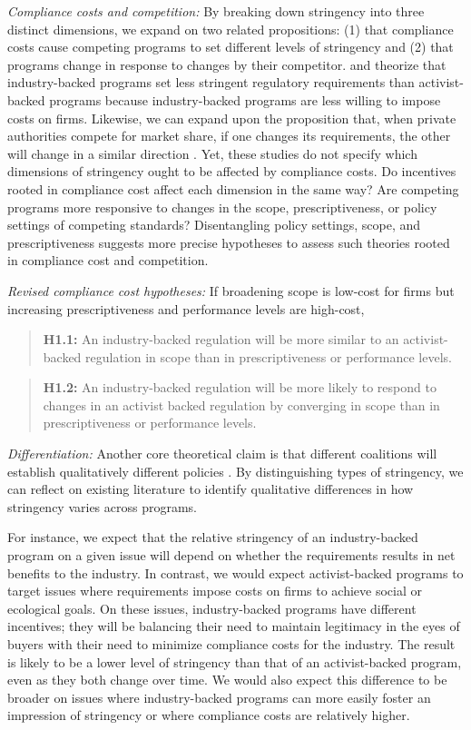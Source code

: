 \documentclass[
      12pt,
            Review ]{article}
\begin{document}
\emph{Compliance costs and competition:} By breaking down stringency
into three distinct dimensions, we expand on two related propositions:
(1) that compliance costs cause competing programs to set different
levels of stringency and (2) that programs change in response to changes
by their competitor. \citet{Cashore2004} and \citet{Fischer2014}
theorize that industry-backed programs set less stringent regulatory
requirements than activist-backed programs because industry-backed
programs are less willing to impose costs on firms. Likewise, we can
expand upon the proposition that, when private authorities compete for
market share, if one changes its requirements, the other will change in
a similar direction \citep{Fischer2014, Smith2010}. Yet, these studies
do not specify which dimensions of stringency ought to be affected by
compliance costs. Do incentives rooted in compliance cost affect each
dimension in the same way? Are competing programs more responsive to
changes in the scope, prescriptiveness, or policy settings of competing
standards? Disentangling policy settings, scope, and prescriptiveness
suggests more precise hypotheses to assess such theories rooted in
compliance cost and competition.

\emph{Revised compliance cost hypotheses:} If broadening scope is
low-cost for firms but increasing prescriptiveness and performance
levels are high-cost,

\begin{quote}
\textbf{H1.1:} An industry-backed regulation will be more similar to an
activist-backed regulation in scope than in prescriptiveness or
performance levels.
\end{quote}

\begin{quote}
\textbf{H1.2:} An industry-backed regulation will be more likely to
respond to changes in an activist backed regulation by converging in
scope than in prescriptiveness or performance levels.
\end{quote}

\emph{Differentiation:} Another core theoretical claim is that different
coalitions will establish qualitatively different policies
\citep{Botzem2012, Hsueh2012}. By distinguishing types of stringency, we
can reflect on existing literature to identify qualitative differences
in how stringency varies across programs.

For instance, we expect that the relative stringency of an
industry-backed program on a given issue will depend on whether the
requirements results in net benefits to the industry. In contrast, we
would expect activist-backed programs to target issues where
requirements impose costs on firms to achieve social or ecological
goals. On these issues, industry-backed programs have different
incentives; they will be balancing their need to maintain legitimacy in
the eyes of buyers with their need to minimize compliance costs for the
industry. The result is likely to be a lower level of stringency than
that of an activist-backed program, even as they both change over time.
We would also expect this difference to be broader on issues where
industry-backed programs can more easily foster an impression of
stringency or where compliance costs are relatively higher.
\end{document}
